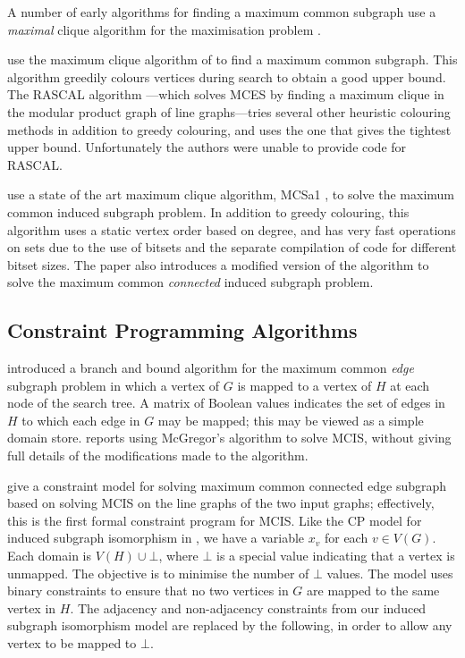 A number of early algorithms for finding a maximum common subgraph use a \emph{maximal}
clique algorithm \citep{DBLP:journals/cacm/BronK73} for the maximisation problem
\citep{durand1999efficient,DBLP:conf/mco/VismaraV08}.

\citet{DBLP:conf/sspr/BunkeFGSV02} use the maximum clique algorithm of
\citet{DBLP:journals/siamcomp/BalasY86} to find a maximum common subgraph.
This algorithm greedily colours vertices during search to obtain a good upper
bound.  The RASCAL algorithm \citep{raymond2002rascal}---which solves MCES by
finding a maximum clique in the modular product graph of line graphs---tries
several other heuristic colouring methods in addition to greedy colouring, and
uses the one that gives the tightest upper bound.  Unfortunately the authors
were unable to provide code for RASCAL.

\cite{DBLP:conf/cp/McCreeshNPS16} use a state of the art maximum clique
algorithm, MCSa1
\citep{DBLP:journals/algorithms/Prosser12,DBLP:journals/ieicet/TomitaSHW13},
to solve the maximum common induced subgraph problem.  In addition to greedy
colouring, this algorithm uses a static vertex order based on degree, and has
very fast operations on sets due to the use of bitsets and the separate
compilation of code for different bitset sizes.  The paper also introduces a
modified version of the algorithm to solve the maximum common \emph{connected}
induced subgraph problem.

\subsection{Constraint Programming Algorithms}

\citet{DBLP:journals/spe/McGregor82}
introduced a branch and bound algorithm for the maximum common
\emph{edge} subgraph problem in which a vertex of $G$ is mapped to a vertex
of $H$ at each node of the search tree.  A matrix of Boolean values indicates
the set of edges in $H$ to which each edge in $G$ may be mapped; this may be
viewed as a simple domain store. \citet{DBLP:conf/sspr/BunkeFGSV02}
reports using McGregor's algorithm to solve MCIS, without giving full
details of the modifications made to the algorithm.

\citet{DBLP:conf/mco/VismaraV08} give a constraint model for solving maximum
common connected edge subgraph based on solving MCIS on the line graphs of the
two input graphs; effectively, this is the first formal constraint program for
MCIS.  Like the CP model for induced subgraph isomorphism in
, we have a variable $x_v$ for each $v \in V(G)$.
Each domain is $V(H) \cup \bot$, where $\bot$ is a special value indicating that
a vertex is unmapped.  The objective is to minimise the number of $\bot$
values.  The model uses binary constraints to ensure that no two vertices in
$G$ are mapped to the same vertex in $H$.  The adjacency and non-adjacency
constraints from our induced subgraph isomorphism model are replaced by the
following, in order to allow any vertex to be mapped to $\bot$.

